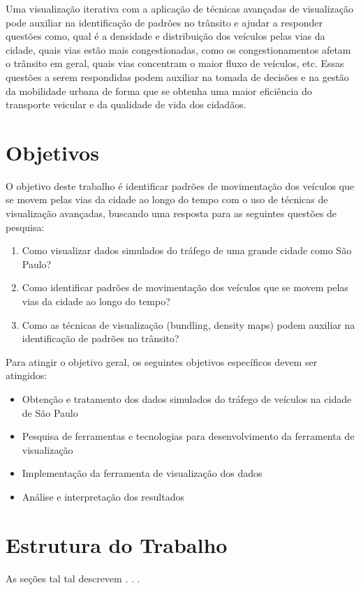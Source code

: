 Uma visualização iterativa com a aplicação de técnicas avançadas de visualização
pode auxiliar na identificação de padrões no trânsito e ajudar a responder questões como,
qual é a densidade e distribuição dos veículos pelas vias da cidade, quais vias
estão mais congestionadas, como os congestionamentos afetam o trânsito em
geral, quais vias concentram o maior fluxo de veículos, etc. Essas questões a
serem respondidas podem auxiliar na tomada de decisões e na gestão da mobilidade
urbana de forma que se obtenha uma maior eficiência do transporte
veicular e da qualidade de vida dos cidadãos.

\section{Objetivos}
\label{sec:objetivos}

O objetivo deste trabalho é identificar padrões de movimentação dos veículos que
se movem pelas vias da cidade ao longo do tempo com o uso de técnicas
de visualização avançadas, buscando uma resposta para as seguintes
questões de pesquisa:

\begin{enumerate}
  \item Como visualizar dados simulados do tráfego de uma grande cidade como São Paulo?

  \item Como identificar padrões de movimentação dos veículos que se movem pelas vias
  da cidade ao longo do tempo?
        
  \item Como as técnicas de visualização (bundling, density maps) podem auxiliar na
    identificação de padrões no trânsito?
\end{enumerate}

Para atingir o objetivo geral, os seguintes objetivos específicos devem ser atingidos:

\begin{itemize}
  \item Obtenção e tratamento dos dados simulados do tráfego de veículos na cidade de São Paulo
  \item Pesquisa de ferramentas e tecnologias para desenvolvimento da ferramenta de visualização
  \item Implementação da ferramenta de visualização dos dados 
  \item Análise e interpretação dos resultados
\end{itemize}

\section{Estrutura do Trabalho}

As seções tal tal descrevem . . .
